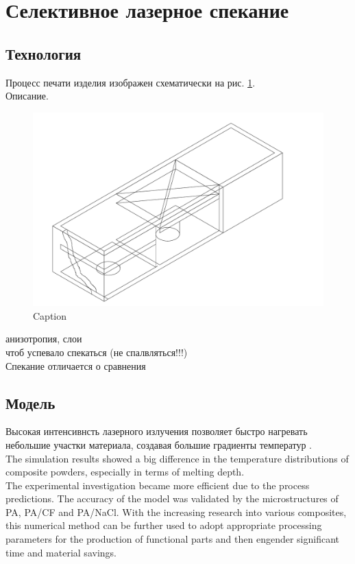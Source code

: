 \section{Селективное лазерное спекание}
\subsection{Технология}
Процесс печати изделия изображен схематически на рис. \ref{fig:printer}.\\
Описание. 

\begin{figure}[h]
    \centering
    \includegraphics[width=\linewidth]{fig/sls-30deg.pdf}
    \caption{Caption}
    \label{fig:printer}
\end{figure}
анизотропия, слои\\
чтоб успевало спекаться (не спалвляться!!!)\\
Спекание отличается о сравнения

\subsection{Модель}
Высокая интенсивнсть лазерного излучения позволяет быстро нагревать небольшие участки материала, создавая большие градиенты температур \cite{sls-sim2016}.
\\

The simulation
results showed a big difference in the temperature distributions
of composite powders, especially in terms of melting depth.\\
The experimental investigation became more
efficient due to the process predictions. The accuracy of the model
was validated by the microstructures of PA, PA/CF and PA/NaCl.
With the increasing research into various composites, this numerical
method can be further used to adopt appropriate processing
parameters for the production of functional parts and then engender
significant time and material savings.
